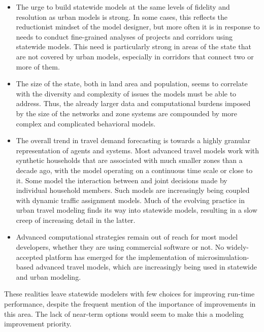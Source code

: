 \begin{itemize}
\item
The urge to build statewide models at the same levels of fidelity and resolution as urban models is strong. In some cases, this reflects the reductionist mindset of the model designer, but more often it is in response to needs to conduct fine-grained analyses of projects and corridors using statewide models. This need is particularly strong in areas of the state that are not covered by urban models, especially in corridors that connect two or more of them.
\item
The size of the state, both in land area and population, seems to correlate with the diversity and complexity of issues the models must be able to address. Thus, the already larger data and computational burdens imposed by the size of the networks and zone systems are compounded by more complex and complicated behavioral models.
\item
The overall trend in travel demand forecasting is towards a highly granular representation of agents and systems. Most advanced travel models work with synthetic households that are associated with much smaller zones than a decade ago, with the model operating on a continuous time scale or close to it. Some model the interaction between and joint decisions made by individual household members. Such models are increasingly being coupled with dynamic traffic assignment models. Much of the evolving practice in urban travel modeling finds its way into statewide models, resulting in a slow creep of increasing detail in the latter.
\item
Advanced computational strategies remain out of reach for most model developers, whether they are using commercial software or not. No widely-accepted platform has emerged for the implementation of microsimulation-based advanced travel models, which are increasingly being used in statewide and urban modeling.
\end{itemize}

These realities leave statewide modelers with few choices for improving run-time performance, despite the frequent mention of the importance of improvements in this area. The lack of near-term options would seem to make this a modeling improvement priority.
